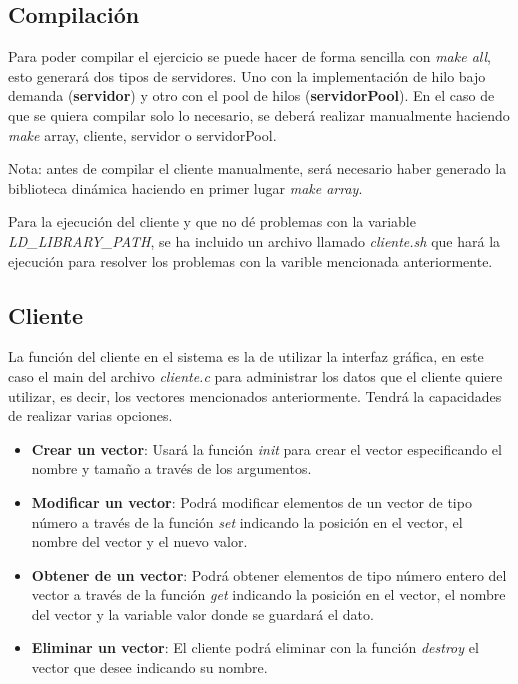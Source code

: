 \documentclass[10pt, spanish, pdftex]{template/UC3M_document}
\begin{document}
\subsection{Compilación}
Para poder compilar el ejercicio se puede hacer de forma sencilla con \textit{make all}, esto generará dos tipos de servidores. Uno con la implementación de hilo bajo demanda (\textbf{servidor}) y otro con el pool de hilos (\textbf{servidorPool}). En el caso de que se quiera compilar solo lo necesario, se deberá realizar manualmente haciendo \textit{make} array, cliente, servidor o servidorPool.

Nota: antes de compilar el cliente manualmente, será necesario haber generado la biblioteca dinámica haciendo en primer lugar \textit{make array}.

Para la ejecución del cliente y que no dé problemas con la variable \textit{LD\_LIBRARY\_PATH}, se ha incluido un archivo llamado \textit{cliente.sh} que hará la ejecución para resolver los problemas con la varible mencionada anteriormente.
\subsection{Cliente}
La función del cliente en el sistema es la de utilizar la interfaz gráfica, en este caso el main del archivo \textit{cliente.c} para administrar los datos que el cliente quiere utilizar, es decir, los vectores mencionados anteriormente. Tendrá la capacidades de realizar varias opciones.

\begin{itemize}
  \item \textbf{Crear un vector}: Usará la función \textit{init} para crear el vector especificando el nombre y tamaño a través de los argumentos.
  \item \textbf{Modificar un vector}: Podrá modificar elementos de un vector de tipo número a través de la función \textit{set} indicando la posición en el vector, el nombre del vector y el nuevo valor.
  \item \textbf{Obtener de un vector}: Podrá obtener elementos de tipo número entero del vector a través de la función \textit{get} indicando la posición en el vector, el nombre del vector y la variable valor donde se guardará el dato.
  \item \textbf{Eliminar un vector}: El cliente podrá eliminar con la función \textit{destroy} el vector que desee indicando su nombre.
\end{itemize}
\end{document}
